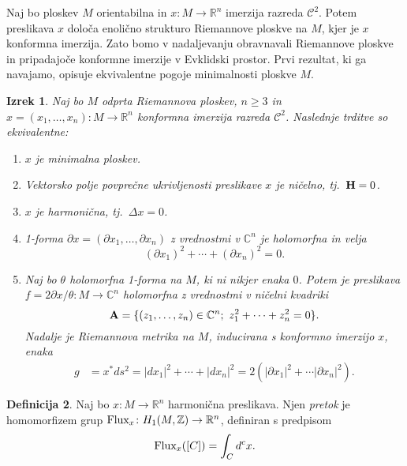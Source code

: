 \documentclass[12pt,a4paper,twoside]{article}
\theoremstyle{definition} %
\newtheorem{definicija}{Definicija}[section]
\theoremstyle{plain} %
\newtheorem{izrek}[definicija]{Izrek}
\numberwithin{equation}{section}  %
\newcommand{\R}{\mathbb R}
\newcommand{\Z}{\mathbb Z}
\newcommand{\C}{\mathbb C}
\begin{document}
Naj bo ploskev $M$ orientabilna in $x \colon M \to \R^{n}$ imerzija razreda $\mathcal{C}^2$. Potem preslikava $x$ določa enolično strukturo Riemannove ploskve na $M$, kjer je $x$ konformna imerzija. Zato bomo v nadaljevanju obravnavali Riemannove ploskve in pripadajoče konformne imerzije v Evklidski prostor.
Prvi rezultat, ki ga navajamo, opisuje ekvivalentne pogoje minimalnosti ploskve $M$.

\begin{izrek}
Naj bo $M$ odprta Riemannova ploskev, $n \geq 3$ in $x = (x_1, \dots , x_n) \colon M \to \R^{n}$ konformna imerzija razreda $\mathcal{C}^2$. Naslednje trditve so ekvivalentne:
\begin{enumerate}
	\item $x$ je minimalna ploskev.
	\item Vektorsko polje povprečne ukrivljenosti preslikave $x$ je ničelno, tj.~$\textbf{\textup{H}} = 0$.
	\item $x$ je harmonična, tj.~$\Delta{x} = 0$.
	\item 1-forma $ \partial{x} = (\partial{x_1}, \dots , \partial{x_n})$ z vrednostmi v $\C^{n}$ je holomorfna in velja
			\begin{equation}
			(\partial{x_1})^2 + \cdots + (\partial{x_n})^2 = 0.
			\end{equation}
	\item Naj bo $\theta$ holomorfna 1-forma na $M$, ki ni nikjer enaka $0$. Potem je preslikava $f = 2\partial{x} / \theta \colon M \to \C^{n}$ holomorfna z 				vrednostmi v \emph{ničelni kvadriki}
			\begin{equation} \label{ničelna-kvadrika}		
			\textbf{\textup{A}} = \{ (z_1, \dots , z_n) \in \C^{n} ; \ z_{1}^{2} + \cdots + z_{n}^{2} = 0 \}.
			\end{equation}	
		Nadalje je Riemannova metrika na $M$, inducirana s konformno imerzijo $x$, enaka
			\begin{align}
			g &= x^{*} ds^2 = |dx_1|^2 + \cdots + |dx_n|^2 = 2 (|\partial{x_1}|^2 + \cdots |\partial{x_n}|^2).
			\end{align}			
\end{enumerate}
\end{izrek}

\begin{definicija}
Naj bo $x \colon M \to \R^{n}$ harmonična preslikava. Njen \emph{pretok} je homomorfizem grup $\textup{Flux}_{x} \colon H_{1} (M, \Z) \to \R^{n}$, definiran s predpisom 
\begin{equation}
\textup{Flux}_{x} ([C]) = \int_{C} {d^{c} x}.
\end{equation}
\end{definicija}
\end{document}
